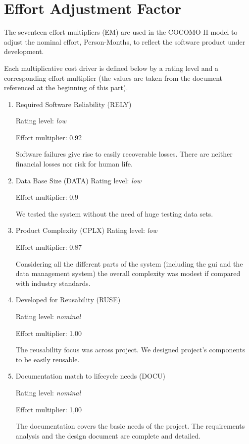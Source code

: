 \documentclass[10pt,a4paper,titlepage]{article}
\begin{document}
\section{Effort Adjustment Factor}
The seventeen effort multipliers (EM) are used in the COCOMO II model to adjust the nominal effort, Person-Months, to reflect the software product under development.
 
Each multiplicative cost driver is defined below by a rating level and a corresponding  effort multiplier (the values are taken from the document referenced at the beginning of this part).  
 
\begin{enumerate}
\item Required Software Reliability (RELY)

Rating level: \textit{low}

Effort multiplier: 0.92

Software failures give rise to easily recoverable losses. There are neither financial losses nor risk for human life.

\item Data Base Size (DATA) 
Rating level: \textit{low}

Effort multiplier: 0,9 
 
We tested the system without the need of huge testing data sets.

\item Product Complexity (CPLX) 
Rating level: \textit{low}

Effort multiplier: 0,87 
 
Considering all the different parts of the system (including the gui and the data management system) the overall complexity was modest if compared with industry standards. 
 
\item Developed for Reusability (RUSE)

Rating level: \textit{nominal}

Effort multiplier: 1,00 
 
The reusability focus was across project. We designed project's components to be easily reusable.  

\item Documentation match to lifecycle needs (DOCU)

Rating level: \textit{nominal}

Effort multiplier: 1,00 
 
The documentation covers the basic needs of the project. The requirements analysis and the design document are complete and detailed. 
 

\end{enumerate}
\end{document}
